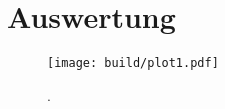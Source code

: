 \section{Auswertung}

\begin{figure}
    \centering
    \texttt{[image: build/plot1.pdf]}
    \caption{.} 
    \label{fig:müdes}
\end{figure}